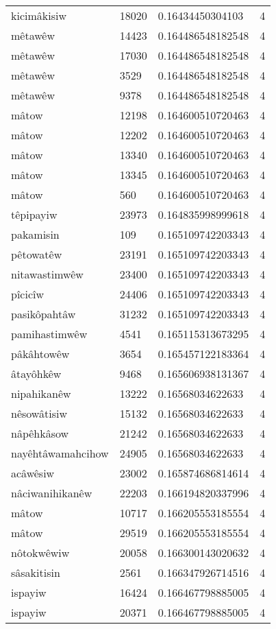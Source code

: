 \begin{longtable}{llll}
kicimâkisiw & 18020 & 0.16434450304103 & 4 \\
mêtawêw & 14423 & 0.164486548182548 & 4 \\
mêtawêw & 17030 & 0.164486548182548 & 4 \\
mêtawêw & 3529 & 0.164486548182548 & 4 \\
mêtawêw & 9378 & 0.164486548182548 & 4 \\
mâtow & 12198 & 0.164600510720463 & 4 \\
mâtow & 12202 & 0.164600510720463 & 4 \\
mâtow & 13340 & 0.164600510720463 & 4 \\
mâtow & 13345 & 0.164600510720463 & 4 \\
mâtow & 560 & 0.164600510720463 & 4 \\
têpipayiw & 23973 & 0.164835998999618 & 4 \\
pakamisin & 109 & 0.165109742203343 & 4 \\
pêtowatêw & 23191 & 0.165109742203343 & 4 \\
nitawastimwêw & 23400 & 0.165109742203343 & 4 \\
pîcicîw & 24406 & 0.165109742203343 & 4 \\
pasikôpahtâw & 31232 & 0.165109742203343 & 4 \\
pamihastimwêw & 4541 & 0.165115313673295 & 4 \\
pâkâhtowêw & 3654 & 0.165457122183364 & 4 \\
âtayôhkêw & 9468 & 0.165606938131367 & 4 \\
nipahikanêw & 13222 & 0.16568034622633 & 4 \\
nêsowâtisiw & 15132 & 0.16568034622633 & 4 \\
nâpêhkâsow & 21242 & 0.16568034622633 & 4 \\
nayêhtâwamahcihow & 24905 & 0.16568034622633 & 4 \\
acâwêsiw & 23002 & 0.165874686814614 & 4 \\
nâciwanihikanêw & 22203 & 0.166194820337996 & 4 \\
mâtow & 10717 & 0.166205553185554 & 4 \\
mâtow & 29519 & 0.166205553185554 & 4 \\
nôtokwêwiw & 20058 & 0.166300143020632 & 4 \\
sâsakitisin & 2561 & 0.166347926714516 & 4 \\
ispayiw & 16424 & 0.166467798885005 & 4 \\
ispayiw & 20371 & 0.166467798885005 & 4 \\

\end{longtable}
